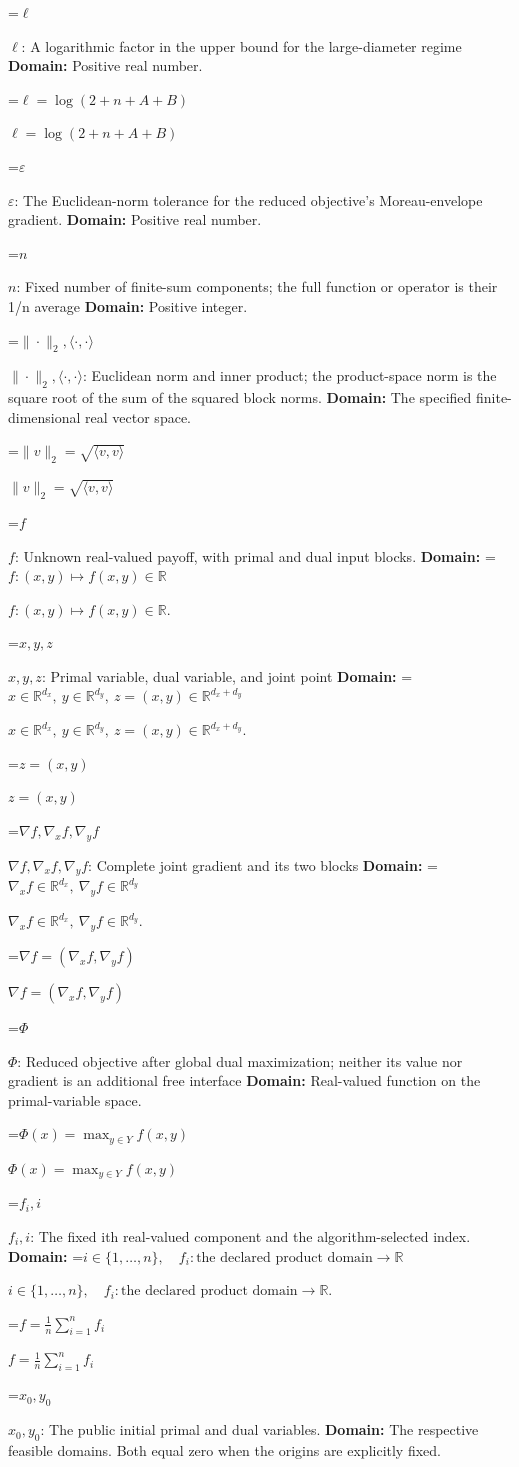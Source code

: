 \documentclass[10pt,a4paper]{article}
\newcommand{\AtlasMath}[1]{\par\begingroup\centering\setbox0=\hbox{$\displaystyle #1$}\ifdim\wd0>1.4\linewidth\typeout{ATLAS WIDE FORMULA: \the\wd0}\fi\ifdim\wd0>\linewidth\resizebox{\linewidth}{!}{\box0}\else\box0\fi\par\endgroup}
\newcommand{\AtlasInlineMath}[1]{\begingroup\setbox0=\hbox{$#1$}\ifdim\wd0>.4\linewidth\endgroup\AtlasMath{#1}\else\endgroup$#1$\fi}
\begin{document}
\AtlasInlineMath{\ell}: A logarithmic factor in the upper bound for the large-diameter regime \textbf{Domain:} Positive real number.

\AtlasInlineMath{\ell=\log(2+n+A+B)}

\AtlasInlineMath{\varepsilon}: The Euclidean-norm tolerance for the reduced objective’s Moreau-envelope gradient. \textbf{Domain:} Positive real number.

\AtlasInlineMath{n}: Fixed number of finite-sum components; the full function or operator is their 1/n average \textbf{Domain:} Positive integer.

\AtlasInlineMath{\|\cdot\|_2,\langle\cdot,\cdot\rangle}: Euclidean norm and inner product; the product-space norm is the square root of the sum of the squared block norms. \textbf{Domain:} The specified finite-dimensional real vector space.

\AtlasInlineMath{\|v\|_2=\sqrt{\langle v,v\rangle}}

\AtlasInlineMath{f}: Unknown real-valued payoff, with primal and dual input blocks. \textbf{Domain:} \AtlasInlineMath{f:(x,y)\mapsto f(x,y)\in\mathbb R}.

\AtlasInlineMath{x,y,z}: Primal variable, dual variable, and joint point \textbf{Domain:} \AtlasInlineMath{x\in\mathbb R^{d_x},\ y\in\mathbb R^{d_y},\ z=(x,y)\in\mathbb R^{d_x+d_y}}.

\AtlasInlineMath{z=(x,y)}

\AtlasInlineMath{\nabla f,\nabla_x f,\nabla_y f}: Complete joint gradient and its two blocks \textbf{Domain:} \AtlasInlineMath{\nabla_x f\in\mathbb R^{d_x},\ \nabla_y f\in\mathbb R^{d_y}}.

\AtlasInlineMath{\nabla f=(\nabla_x f,\nabla_y f)}

\AtlasInlineMath{\Phi}: Reduced objective after global dual maximization; neither its value nor gradient is an additional free interface \textbf{Domain:} Real-valued function on the primal-variable space.

\AtlasInlineMath{\Phi(x)=\max_{y\in Y}f(x,y)}

\AtlasInlineMath{f_i,i}: The fixed ith real-valued component and the algorithm-selected index. \textbf{Domain:} \AtlasInlineMath{i\in\{1,\ldots,n\},\quad f_i:\text{the declared product domain}\to\mathbb R}.

\AtlasInlineMath{f=\frac1n\sum_{i=1}^n f_i}

\AtlasInlineMath{x_0,y_0}: The public initial primal and dual variables. \textbf{Domain:} The respective feasible domains. Both equal zero when the origins are explicitly fixed.
\end{document}
